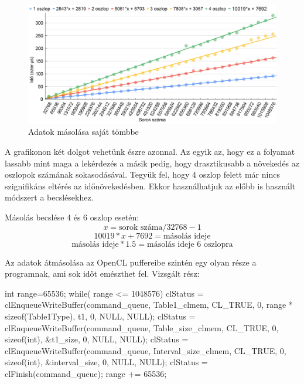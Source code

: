 \begin{figure}[h!]
\centering
\includegraphics[width=\textwidth]{images/graph/ccopy.png}
\caption{Adatok másolása saját tömbbe}
\label{fig:schema}
\end{figure}

A grafikonon két dolgot vehetünk észre azonnal. Az egyik az, hogy ez a folyamat lassabb mint maga a lekérdezés a másik pedig, hogy drasztikusabb a növekedés az oszlopok számának sokasodásával.
Tegyük fel, hogy 4 oszlop felett már nincs szignifikáns eltérés az időnövekedésben. Ekkor használhatjuk az előbb is használt módszert a becslésekhez.

Másolás becslése 4 és 6 oszlop esetén:
$$ x = \text{sorok száma}/32768 - 1 $$
$$ 10019 * x + 7692 = \text{másolás ideje}$$
$$ \text{másolás ideje} * 1.5 = \text{másolás ideje 6 oszlopra} $$


Az adatok átmásolása az OpenCL puffereibe szintén egy olyan része a programnak, ami sok időt emészthet fel.
Vizsgált rész:

\begin{python}
int range=65536;
while( range <= 1048576){
 clStatus = clEnqueueWriteBuffer(command_queue, Table1_clmem,
  CL_TRUE, 0, range * sizeof(Table1Type), t1, 0, NULL, NULL);
 clStatus = clEnqueueWriteBuffer(command_queue, Table_size_clmem,
  CL_TRUE, 0, sizeof(int), &t1_size, 0, NULL, NULL);
 clStatus = clEnqueueWriteBuffer(command_queue, Interval_size_clmem,
  CL_TRUE, 0, sizeof(int), &interval_size, 0, NULL, NULL);
 clStatus = clFinish(command_queue);
	range += 65536;
}
\end{python}

